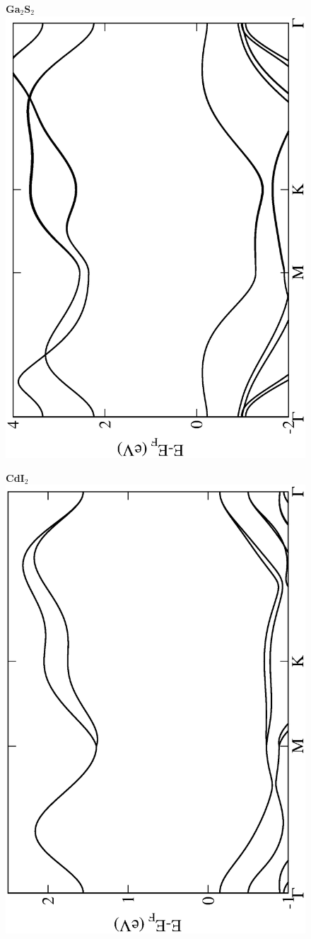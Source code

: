\begin{figure}[htbp]
\centering
{\bfseries \sffamily Ga$_{2}$S$_{2}$}\\
\includegraphics[width=0.45\linewidth, angle=-90, trim={2.9cm, 0cm, 2cm, 0cm}, clip]{img/SI_figs/BS/GaS.eps}
\end{figure}

\begin{figure}[htbp]
\centering
{\bfseries \sffamily CdI$_{2}$}\\
\includegraphics[width=0.45\linewidth, angle=-90, trim={2.9cm, 0cm, 2cm, 0cm}, clip]{img/SI_figs/BS/CdI2.eps}
\end{figure}

